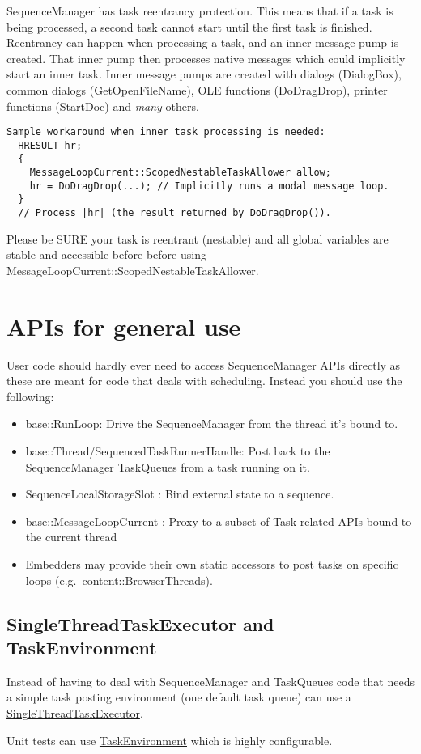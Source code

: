 \documentclass[a4paper,12pt,notitlepage,twoside,openright]{article}
\begin{document}
SequenceManager has task reentrancy protection. This means that if a
task is being processed, a second task cannot start until the first task
is finished. Reentrancy can happen when processing a task, and an inner
message pump is created. That inner pump then processes native messages
which could implicitly start an inner task. Inner message pumps are
created with dialogs (DialogBox), common dialogs (GetOpenFileName), OLE
functions (DoDragDrop), printer functions (StartDoc) and \emph{many}
others.

\begin{verbatim}
Sample workaround when inner task processing is needed:
  HRESULT hr;
  {
    MessageLoopCurrent::ScopedNestableTaskAllower allow;
    hr = DoDragDrop(...); // Implicitly runs a modal message loop.
  }
  // Process |hr| (the result returned by DoDragDrop()).
\end{verbatim}

Please be SURE your task is reentrant (nestable) and all global
variables are stable and accessible before before using
MessageLoopCurrent::ScopedNestableTaskAllower.

\hypertarget{apis-for-general-use}{%
\section{APIs for general use}\label{apis-for-general-use}}

User code should hardly ever need to access SequenceManager APIs
directly as these are meant for code that deals with scheduling. Instead
you should use the following:

\begin{itemize}
\item
  base::RunLoop: Drive the SequenceManager from the thread it's bound
  to.
\item
  base::Thread/SequencedTaskRunnerHandle: Post back to the
  SequenceManager TaskQueues from a task running on it.
\item
  SequenceLocalStorageSlot : Bind external state to a sequence.
\item
  base::MessageLoopCurrent : Proxy to a subset of Task related APIs
  bound to the current thread
\item
  Embedders may provide their own static accessors to post tasks on
  specific loops (e.g.~content::BrowserThreads).
\end{itemize}

\hypertarget{singlethreadtaskexecutor-and-taskenvironment}{%
\subsection{SingleThreadTaskExecutor and
TaskEnvironment}\label{singlethreadtaskexecutor-and-taskenvironment}}

Instead of having to deal with SequenceManager and TaskQueues code that
needs a simple task posting environment (one default task queue) can use
a
\href{https://cs.chromium.org/chromium/src/base/task/single_thread_task_executor.h}{SingleThreadTaskExecutor}.

Unit tests can use
\href{https://cs.chromium.org/chromium/src/base/test/task_environment.h}{TaskEnvironment}
which is highly configurable.
\end{document}
